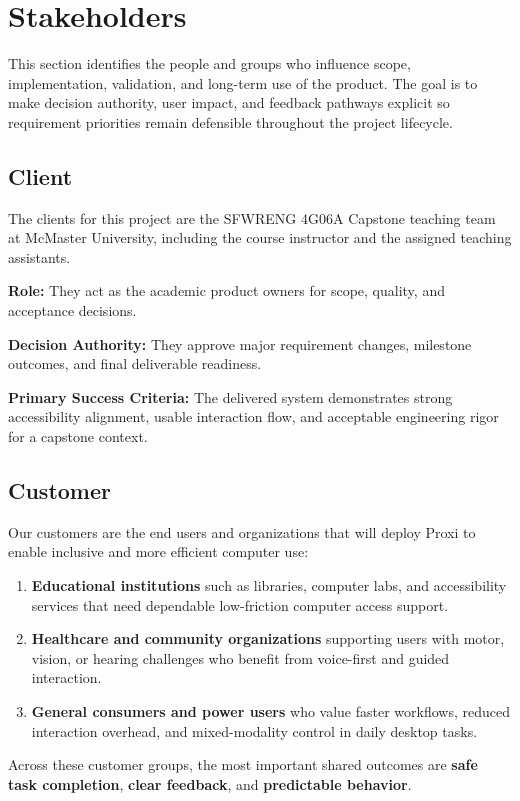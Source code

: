 \documentclass[12pt]{article}
\begin{document}
\section{Stakeholders}
This section identifies the people and groups who influence scope,
implementation, validation, and long-term use of the product. The goal
is to make decision authority, user impact, and feedback pathways
explicit so requirement priorities remain defensible throughout the
project lifecycle.

\subsection{Client}
The clients for this project are the SFWRENG 4G06A Capstone teaching
team at McMaster University, including the course instructor and the
assigned teaching assistants.

\textbf{Role:}
They act as the academic product owners for scope, quality, and
acceptance decisions.

\textbf{Decision Authority:}
They approve major requirement changes, milestone outcomes, and final
deliverable readiness.

\textbf{Primary Success Criteria:}
The delivered system demonstrates strong accessibility alignment,
usable interaction flow, and acceptable engineering rigor for a
capstone context.

\subsection{Customer}
Our customers are the end users and organizations that will deploy
Proxi to enable inclusive and more efficient computer use:
\begin{enumerate}
  \item \textbf{Educational institutions} such as libraries, computer
  labs, and accessibility services that need dependable low-friction
  computer access support.
  \item \textbf{Healthcare and community organizations} supporting
  users with motor, vision, or hearing challenges who benefit from
  voice-first and guided interaction.
  \item \textbf{General consumers and power users} who value faster
  workflows, reduced interaction overhead, and mixed-modality control
  in daily desktop tasks.
\end{enumerate}

Across these customer groups, the most important shared outcomes are
\textbf{safe task completion}, \textbf{clear feedback}, and
\textbf{predictable behavior}.
\end{document}
